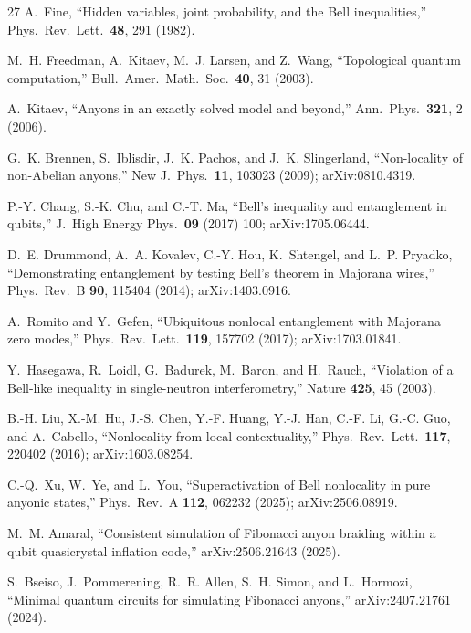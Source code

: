 \documentclass[aps,pra,twocolumn,superscriptaddress,showpacs,floatfix]{revtex4-2}
\begin{document}
\begin{thebibliography}{27}
A.~Fine,
``Hidden variables, joint probability, and the Bell inequalities,''
Phys.\ Rev.\ Lett.\ \textbf{48}, 291 (1982).

M.~H. Freedman, A.~Kitaev, M.~J. Larsen, and Z.~Wang,
``Topological quantum computation,''
Bull.\ Amer.\ Math.\ Soc.\ \textbf{40}, 31 (2003).

A.~Kitaev,
``Anyons in an exactly solved model and beyond,''
Ann.\ Phys.\ \textbf{321}, 2 (2006).


G.~K. Brennen, S.~Iblisdir, J.~K. Pachos, and J.~K. Slingerland,
``Non-locality of non-Abelian anyons,''
New J.\ Phys.\ \textbf{11}, 103023 (2009);
arXiv:0810.4319.

P.-Y. Chang, S.-K. Chu, and C.-T. Ma,
``Bell's inequality and entanglement in qubits,''
J.\ High Energy Phys.\ \textbf{09} (2017) 100;
arXiv:1705.06444.

D.~E. Drummond, A.~A. Kovalev, C.-Y. Hou, K.~Shtengel, and L.~P. Pryadko,
``Demonstrating entanglement by testing Bell's theorem in Majorana wires,''
Phys.\ Rev.\ B \textbf{90}, 115404 (2014);
arXiv:1403.0916.

A.~Romito and Y.~Gefen,
``Ubiquitous nonlocal entanglement with Majorana zero modes,''
Phys.\ Rev.\ Lett.\ \textbf{119}, 157702 (2017);
arXiv:1703.01841.

Y.~Hasegawa, R.~Loidl, G.~Badurek, M.~Baron, and H.~Rauch,
``Violation of a Bell-like inequality in single-neutron interferometry,''
Nature \textbf{425}, 45 (2003).

B.-H. Liu, X.-M. Hu, J.-S. Chen, Y.-F. Huang, Y.-J. Han, C.-F. Li, G.-C. Guo, and A.~Cabello,
``Nonlocality from local contextuality,''
Phys.\ Rev.\ Lett.\ \textbf{117}, 220402 (2016);
arXiv:1603.08254.

C.-Q.~Xu, W.~Ye, and L.~You,
``Superactivation of Bell nonlocality in pure anyonic states,''
Phys.\ Rev.\ A \textbf{112}, 062232 (2025);
arXiv:2506.08919.

M.~M. Amaral,
``Consistent simulation of Fibonacci anyon braiding within a qubit quasicrystal inflation code,''
arXiv:2506.21643 (2025).

S.~Bseiso, J.~Pommerening, R.~R. Allen, S.~H. Simon, and L.~Hormozi,
``Minimal quantum circuits for simulating Fibonacci anyons,''
arXiv:2407.21761 (2024).


\end{thebibliography}
\end{document}
